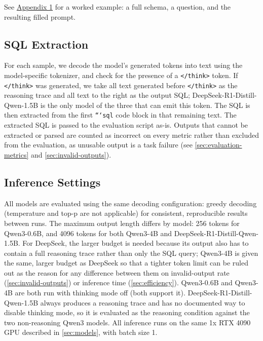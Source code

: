 See \hyperref[sec:appendix1]{Appendix 1} for a worked example: a full schema, a question, and the resulting filled prompt.

\subsection{SQL Extraction}
\label{sec:sql-extraction}

For each sample, we decode the model's generated tokens into text using the model-specific tokenizer, and check for the presence of a \texttt{</think>} token. If \texttt{</think>} was generated, we take all text generated before \texttt{</think>} as the reasoning trace and all text to the right as the output SQL; DeepSeek-R1-Distill-Qwen-1.5B is the only model of the three that can emit this token. The SQL is then extracted from the first \texttt{```sql} code block in that remaining text. The extracted SQL is passed to the evaluation script as-is. Outputs that cannot be extracted or parsed are counted as incorrect on every metric rather than excluded from the evaluation, as unusable output is a task failure (see \ref{sec:evaluation-metrics} and \ref{sec:invalid-outputs}).

\subsection{Inference Settings}
\label{sec:inference-settings}

All models are evaluated using the same decoding configuration: greedy decoding (temperature and top-p are not applicable) for consistent, reproducible results between runs. The maximum output length differs by model: 256 tokens for Qwen3-0.6B, and 4096 tokens for both Qwen3-4B and DeepSeek-R1-Distill-Qwen-1.5B. For DeepSeek, the larger budget is needed because its output also has to contain a full reasoning trace rather than only the SQL query; Qwen3-4B is given the same, larger budget as DeepSeek so that a tighter token limit can be ruled out as the reason for any difference between them on invalid-output rate (\ref{sec:invalid-outputs}) or inference time (\ref{sec:efficiency}). Qwen3-0.6B and Qwen3-4B are both run with thinking mode off (both support it). DeepSeek-R1-Distill-Qwen-1.5B always produces a reasoning trace and has no documented way to disable thinking mode, so it is evaluated as the reasoning condition against the two non-reasoning Qwen3 models. All inference runs on the same 1x RTX 4090 GPU described in \ref{sec:models}, with batch size 1.


